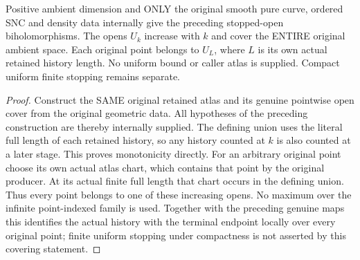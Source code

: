 \begin{theorem}
\label{hir:sharp-actual-curve-original-stopped-open-cover}
\leanok
Positive ambient dimension and ONLY the original smooth pure curve,
ordered SNC and density data internally give the preceding stopped-open
biholomorphisms. The opens $U_k$ increase with $k$ and cover the ENTIRE
original ambient space. Each original point belongs to $U_L$, where $L$
is its own actual retained history length. No uniform bound or caller
atlas is supplied. Compact uniform finite stopping remains separate.
\end{theorem}
\begin{proof}
Construct the SAME original retained atlas and its genuine pointwise
open cover from the original geometric data. All hypotheses of the
preceding construction are thereby internally supplied. The defining
union uses the literal full length of each retained history, so any
history counted at $k$ is also counted at a later stage. This proves
monotonicity directly. For an arbitrary original point choose its own
actual atlas chart, which contains that point by the original producer.
At its actual finite full length that chart occurs in the defining
union. Thus every point belongs to one of these increasing opens. No
maximum over the infinite point-indexed family is used. Together with
the preceding genuine maps this identifies the actual history with the
terminal endpoint locally over every original point; finite uniform
stopping under compactness is not asserted by this covering statement.
\end{proof}
